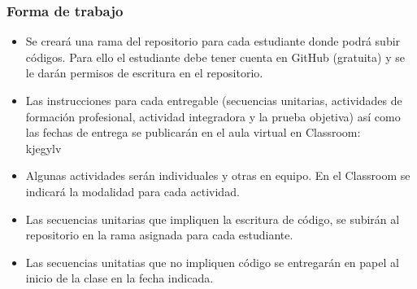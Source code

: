 \begin{frame}\frametitle{Forma de trabajo}
  \begin{itemize}
  \item Se creará una rama del repositorio para cada estudiante donde podrá subir códigos. Para ello el estudiante debe tener cuenta en GitHub (gratuita) y se le darán permisos de escritura en el repositorio.
  \item Las instrucciones para cada entregable (secuencias unitarias, actividades de formación profesional, actividad integradora y la prueba objetiva) así como las fechas de entrega se publicarán en el aula virtual en Classroom:\\
    \[\]
    \Large{kjegylv}
    \normalsize{\\}
    \[\]
  \item Algunas actividades serán individuales y otras en equipo. En el Classroom se indicará la modalidad para cada actividad. 
  \item Las secuencias unitarias que impliquen la escritura de código, se subirán al repositorio en la rama asignada para cada estudiante.
  \item Las secuencias unitatias que no impliquen código se entregarán en papel al inicio de la clase en la fecha indicada.
  \end{itemize}
\end{frame}



